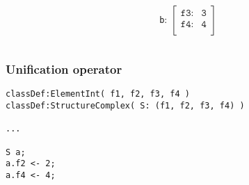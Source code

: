 \documentclass[11pt]{beamer}
\begin{document}
\begin{frame}[fragile]
\begin{columns}
\begin{column}{0.5\textwidth}
\begin{center}
		\end{center}
	\end{column}
	\begin{column}{0.5\textwidth}
		\begin{center}
			\texttt{b}: $\begin{bmatrix}
																				\texttt{f3:}      & \texttt{3}\\ 
																				\texttt{f4:}     	& \texttt{4}\\ 
																			\end{bmatrix}$
		\end{center}
	\end{column}
\end{columns}
\end{frame}


\begin{frame}[fragile]
\frametitle{Unification operator}
\scriptsize
\begin{lstlisting}[language=lekta]
classDef:ElementInt( f1, f2, f3, f4 )
classDef:StructureComplex( S: (f1, f2, f3, f4) )

...

S a;
a.f2 <- 2;
a.f4 <- 4;


\end{lstlisting}
\end{frame}
\end{document}
